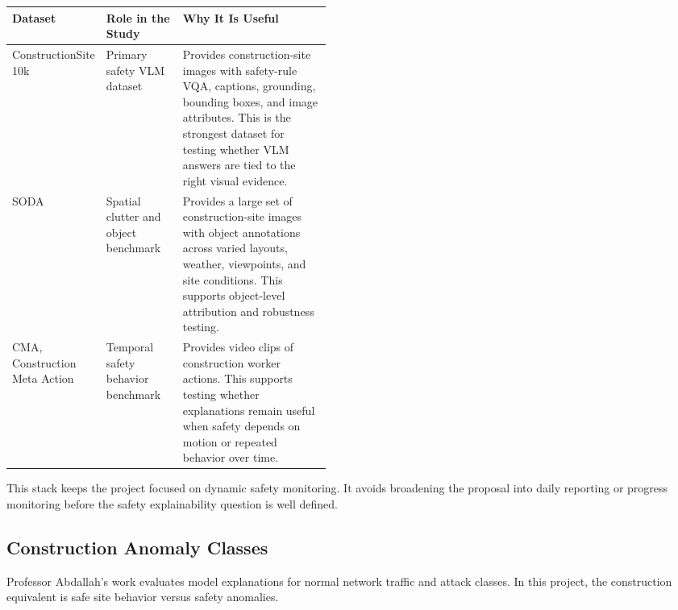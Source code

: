 \documentclass[11pt,letterpaper]{article}
\renewcommand{\arraystretch}{1.25}
\newcommand{\tableheader}{\rowcolor{tablefill}}
\begin{document}
\begingroup
\small
\renewcommand{\arraystretch}{1.15}
\begin{tabularx}{\linewidth}{>{\raggedright\arraybackslash}p{0.22\linewidth} >{\raggedright\arraybackslash}p{0.24\linewidth} Y}
\toprule
\tableheader \textbf{Dataset} & \textbf{Role in the Study} & \textbf{Why It Is Useful} \\
\midrule
ConstructionSite 10k & Primary safety VLM dataset & Provides construction-site images with safety-rule VQA, captions, grounding, bounding boxes, and image attributes. This is the strongest dataset for testing whether VLM answers are tied to the right visual evidence. \\
\midrule
SODA & Spatial clutter and object benchmark & Provides a large set of construction-site images with object annotations across varied layouts, weather, viewpoints, and site conditions. This supports object-level attribution and robustness testing. \\
\midrule
CMA, Construction Meta Action & Temporal safety behavior benchmark & Provides video clips of construction worker actions. This supports testing whether explanations remain useful when safety depends on motion or repeated behavior over time. \\
\bottomrule
\end{tabularx}
\endgroup

This stack keeps the project focused on dynamic safety monitoring. It avoids broadening the proposal into daily reporting or progress monitoring before the safety explainability question is well defined.

\subsection{Construction Anomaly Classes}

Professor Abdallah's work evaluates model explanations for normal network traffic and attack classes. In this project, the construction equivalent is safe site behavior versus safety anomalies.
\end{document}
